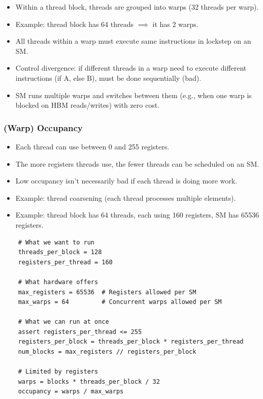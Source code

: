 \documentclass[12pt,twoside]{article}
\begin{document}
\begin{itemize}
    \item Within a thread block, threads are grouped into warps (32 threads per warp).
    \item Example: thread block has 64 threads \(\implies\) it has 2 warps.
    \item All threads within a warp must execute same instructions in lockstep on an SM.
    \item Control divergence: if different threads in a warp need to execute different instructions (if A, else B), must be done sequentially (bad).
    \item SM runs multiple warps and switches between them (e.g., when one warp is blocked on HBM reads/writes) with zero cost.
\end{itemize}

\subsubsection*{(Warp) Occupancy}

\begin{itemize}
    \item Each thread can use between 0 and 255 registers.
    \item The more registers threads use, the fewer threads can be scheduled on an SM.
    \item Low occupancy isn't necessarily bad if each thread is doing more work.
    \item Example: thread coarsening (each thread processes multiple elements).
    \item Example: thread block has 64 threads, each using 160 registers, SM has 65536 registers.
\end{itemize}

\begin{verbatim}
    # What we want to run
    threads_per_block = 128
    registers_per_thread = 160
    
    # What hardware offers
    max_registers = 65536  # Registers allowed per SM
    max_warps = 64         # Concurrent warps allowed per SM
    
    # What we can run at once
    assert registers_per_thread <= 255
    registers_per_block = threads_per_block * registers_per_thread  
    num_blocks = max_registers // registers_per_block  
    
    # Limited by registers 
    warps = blocks * threads_per_block / 32  
    occupancy = warps / max_warps  
\end{verbatim}
\end{document}
